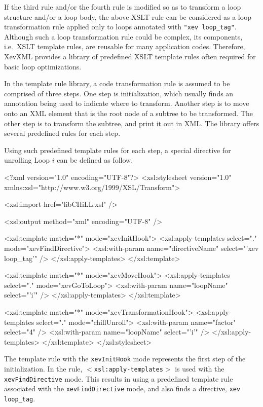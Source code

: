 If the third rule and/or the fourth rule is modified so as to transform
a loop structure and/or a loop body, the above XSLT rule can be
considered as a loop transformation rule applied only to loops annotated
with \texttt{"xev loop\_tag"}. Although such a loop transformation rule
could be complex, its components, i.e.~XSLT template rules, are reusable
for many application codes.  Therefore, XevXML provides a library of
predefined XSLT template rules often required for basic loop
optimizations.


In the template rule library, a code transformation rule is assumed to
be comprised of three steps. One step is initialization, which usually
finds an annotation being used to indicate where to transform. Another
step is to move onto an XML element that is the root node of a subtree
to be transformed. The other step is to transform the subtree, and print
it out in XML. The library offers several predefined rules for each
step.

Using such predefined template rules for each step, a special directive
for unrolling Loop $i$ can be defined as follow.
\begin{framed}
 \begin{src}
<?xml version="1.0" encoding="UTF-8"?>
  <xsl:stylesheet version="1.0"
  xmlns:xsl="http://www.w3.org/1999/XSL/Transform">

  <xsl:import href="libCHiLL.xsl" />

  <xsl:output method="xml" encoding="UTF-8" />

  <xsl:template match="*" mode="xevInitHook">
   <xsl:apply-templates select="." mode="xevFindDirective">
      <xsl:with-param name="directiveName" select="'xev loop_tag'" />
    </xsl:apply-templates>
  </xsl:template>

  <xsl:template match="*" mode="xevMoveHook">
    <xsl:apply-templates select="." mode="xevGoToLoop">
      <xsl:with-param name="loopName" select="'i'" />
    </xsl:apply-templates>
  </xsl:template>

  <xsl:template match="*" mode="xevTransformationHook">
    <xsl:apply-templates select="." mode="chillUnroll">
      <xsl:with-param name="factor" select="4" />
      <xsl:with-param name="loopName" select="'i'" />
    </xsl:apply-templates>
  </xsl:template>
</xsl:stylesheet>
\end{src}
\end{framed}

The template rule with the \texttt{xevInitHook} mode represents the
first step of the initialization. In the rule,
\texttt{$<$xsl:apply-templates$>$} is used with the
\texttt{xevFindDirective} mode. This results in using a predefined
template rule associated with the \texttt{xevFindDirective} mode, and
also finds a directive, \texttt{xev loop\_tag}.

